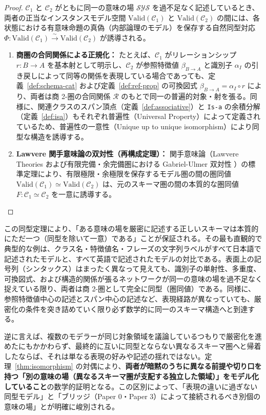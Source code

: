\documentclass[11pt,a4paper]{ltjsarticle}
\theoremstyle{definition}
\theoremstyle{plain}
\theoremstyle{remark}
\newcommand{\Valid}{\mathrm{Valid}}
\begin{document}
\begin{proof}
$\mathcal{C}_1$ と $\mathcal{C}_2$ がともに同一の意味の場 $\mathcal{SYS}$ を過不足なく記述しているとき、両者の正当なインスタンスモデル空間 $\Valid(\mathcal{C}_1)$ と $\Valid(\mathcal{C}_2)$ の間には、各状態における有意味命題の真偽（内部論理のモデル）を保存する自然同型対応 $\Phi : \Valid(\mathcal{C}_1) \xrightarrow{\sim} \Valid(\mathcal{C}_2)$ が誘導される。
\begin{enumerate}
    \item \textbf{商圏の合同関係による正規化：} たとえば、$\mathcal{C}_1$ がリレーションシップ $r : B \to A$ を基本射として明示し、$\mathcal{C}_2$ が参照特徴値 $\beta_{B \to A}$ と識別子 $\alpha_I$ の引き戻しによって同等の関係を表現している場合であっても、定義~\ref{def:schema-cat} および定義~\ref{def:ref-prop} の可換図式 $\beta_{B \to A} = \alpha_I \circ r$ により、両者は商 2-圏の合同関係 $\mathcal{R}$ のもとで同一の普遍的対象・射を張る。同様に、関連クラスのスパン頂点（定義~\ref{def:associative}）と \texttt{Is-a} の余積分解（定義~\ref{def:isa}）もそれぞれ普遍性（Universal Property）によって定義されているため、普遍性の一意性（Unique up to unique isomorphism）により同型な構造を誘導する。
    \item \textbf{Lawvere 関手意味論の双対性（再構成定理）：} 関手意味論（Lawvere Theories および有限完備・余完備圏における Gabriel-Ulmer 双対性 \cite{lawvere1963,gabriel1971}）の標準定理により、有限極限・余極限を保存するモデル圏の間の圏同値 $\Valid(\mathcal{C}_1) \simeq \Valid(\mathcal{C}_2)$ は、元のスキーマ圏の間の本質的な圏同値 $F : \mathcal{C}_1 \simeq \mathcal{C}_2$ を一意に誘導する。 \qedhere
\end{enumerate}
\end{proof}

この同型定理により、「ある意味の場を厳密に記述する正しいスキーマは本質的にただ一つ（同型を除いて一意）である」ことが保証される。その最も直観的で典型的な例は、クラス名・特徴値名・フレーズの文字列ラベルがすべて日本語で記述されたモデルと、すべて英語で記述されたモデルの対比である。表面上の記号列（シンタックス）はまったく異なって見えても、識別子の単射性、多重度、可換図式、および構造的関係が張るネットワークが同一の意味の場を過不足なく捉えている限り、両者は商 2-圏として完全に同型（圏同値）である。同様に、参照特徴値中心の記述とスパン中心の記述など、表現経路が異なっていても、厳密化の条件を突き詰めていく限り必ず数学的に同一のスキーマ構造へと到達する。

逆に言えば、複数のモデラーが同じ対象領域を議論しているつもりで厳密化を進めたにもかかわらず、最終的に互いに同型とならない異なるスキーマ圏へと帰着したならば、それは単なる表現の好みや記述の揺れではない。定理~\ref{thm:isomorphism} の対偶により、\textbf{両者が暗黙のうちに異なる前提や切り口を持つ「別の意味の場（異なるスキーマ圏が支配する独立した領域）」をモデル化していること}の数学的証明となる。この区別によって、「表現の違いに過ぎない同型モデル」と「ブリッジ（Paper 0・Paper 3）によって接続されるべき別個の意味の場」とが明確に峻別される。
\end{document}
